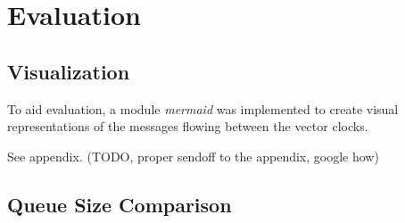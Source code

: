 \documentclass[a4paper, 11pt]{article}
\begin{document}


\section{Evaluation}


\subsection{Visualization}

To aid evaluation, a module \textit{mermaid} was implemented to create visual representations of the messages flowing between the vector clocks.

See appendix. (TODO, proper sendoff to the appendix, google how)

\subsection{Queue Size Comparison}
\end{document}
